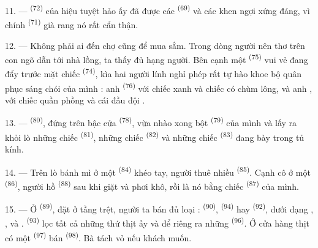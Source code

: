 11. ---  \textsuperscript{(72)} của hiệu tuyệt hảo ấy đã được các
 \textsuperscript{(69)} và các  khen ngợi xứng
đáng, vì chính  \textsuperscript{(71)} già rang nó rất cẩn
thận.

\VUsaut{4.0mm}
\VUsaut{3.0mm}

12. --- Không phải ai đến chợ cũng để mua sắm. Trong dòng người nên thơ trên con ngõ dẫn
tới nhà lồng, ta thấy đủ hạng người. Bên cạnh một 
\textsuperscript{(75)} vui vẻ đang đẩy trước mặt chiếc 
\textsuperscript{(74)}, kìa hai người lính nghỉ phép rất tự hào khoe bộ quân phục sáng
chói của mình : anh  \textsuperscript{(76)} với chiếc  xanh và chiếc  có chùm lông, và anh ,
với chiếc quần phồng và cái đầu đội .

13. ---  \textsuperscript{(80)}, đứng trên bậc cửa  \textsuperscript{(78)}, vừa nhào xong bột 
\textsuperscript{(79)} của mình và lấy ra khỏi lò những chiếc 
\textsuperscript{(81)}, những chiếc  \textsuperscript{(82)} và những
chiếc  \textsuperscript{(83)} đang bày trong tủ kính.

14. --- Trên lò bánh mì ở một  \textsuperscript{(84)} khéo tay,
người thuê nhiều  \textsuperscript{(85)}. Cạnh cô ở một  \textsuperscript{(86)}, người hồ  \textsuperscript{(88)} sau khi
giặt và phơi khô, rồi là nó bằng chiếc  \textsuperscript{(87)} của mình.

\VUsaut{4.0mm}
\VUsaut{3.0mm}

15. --- Ở  \textsuperscript{(89)}, đặt ở tầng trệt, người ta bán đủ
loại  :  \textsuperscript{(90)}, 
\textsuperscript{(94)} hay  \textsuperscript{(92)}, dưới dạng , ,  và . 
\textsuperscript{(93)} lọc tất cả những thứ thịt ấy và để riêng ra những  \textsuperscript{(96)}. Ở cửa hàng thịt có một 
\textsuperscript{(97)} bán  \textsuperscript{(98)}. Bà tách vỏ nếu khách muốn.

